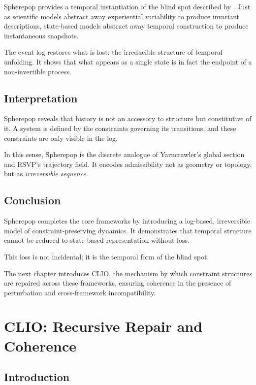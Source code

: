 \documentclass[11pt,openany]{book}
\begin{document}
Spherepop provides a temporal instantiation of the blind
spot described by . Just as scientific
models abstract away experiential variability to produce
invariant descriptions, state-based models abstract away
temporal construction to produce instantaneous snapshots.

The event log restores what is lost: the irreducible
structure of temporal unfolding. It shows that what appears
as a single state is in fact the endpoint of a non-invertible
process.

\section{Interpretation}
\label{sec:interpretation-spherepop}

Spherepop reveals that history is not an accessory to
structure but constitutive of it. A system is defined by the
constraints governing its transitions, and these constraints
are only visible in the log.

In this sense, Spherepop is the discrete analogue of
Yarncrawler's global section and RSVP's trajectory field.
It encodes admissibility not as geometry or topology, but as
\emph{irreversible sequence}.

\section{Conclusion}
\label{sec:conclusion-spherepop}

Spherepop completes the core frameworks by introducing a
log-based, irreversible model of constraint-preserving
dynamics. It demonstrates that temporal structure cannot be
reduced to state-based representation without loss.

This loss is not incidental; it is the temporal form of the
blind spot.

The next chapter introduces CLIO, the mechanism by which
constraint structures are repaired across these frameworks,
ensuring coherence in the presence of perturbation and
cross-framework incompatibility.

\chapter{CLIO: Recursive Repair and Coherence}
\label{ch:clio}

\section{Introduction}
\label{sec:introduction-clio}
\end{document}
